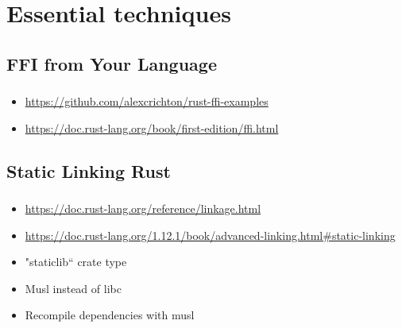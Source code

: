 \documentclass{beamer}
\begin{document}
\section{Essential techniques}

\subsection{FFI from Your Language}

\begin{frame}[fragile]
\frametitle{\insertsubsectionhead}
\begin{itemize}
\item \url{https://github.com/alexcrichton/rust-ffi-examples}
\item \url{https://doc.rust-lang.org/book/first-edition/ffi.html}
\end{itemize}
\end{frame}



\subsection{Static Linking Rust}

\begin{frame}[fragile]
\frametitle{\insertsubsectionhead}

\begin{itemize}
\item \url{https://doc.rust-lang.org/reference/linkage.html}
\item \url{https://doc.rust-lang.org/1.12.1/book/advanced-linking.html#static-linking}
\item "staticlib`` crate type
\item Musl instead of libc
\item Recompile dependencies with musl
\end{itemize}

\end{frame}
\end{document}
